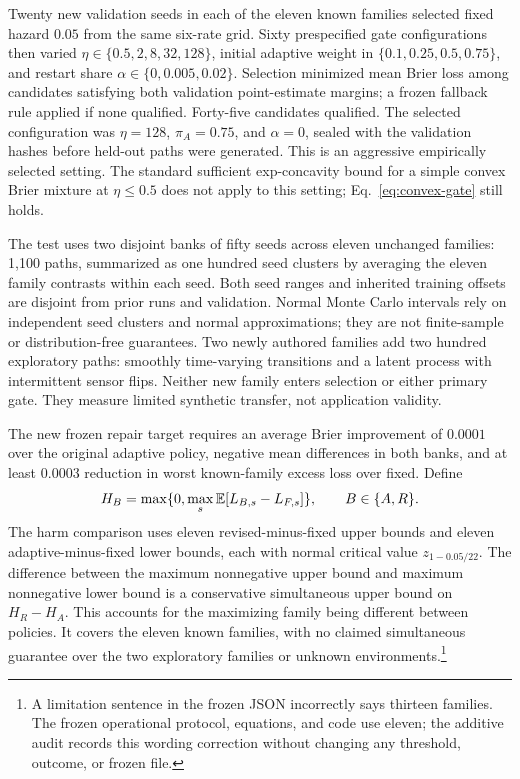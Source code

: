 Twenty new validation seeds in each of the eleven known families selected fixed hazard $0.05$ from the same six-rate grid. Sixty prespecified gate configurations then varied $\eta\in\{0.5,2,8,32,128\}$, initial adaptive weight in $\{0.1,0.25,0.5,0.75\}$, and restart share $\alpha\in\{0,0.005,0.02\}$. Selection minimized mean Brier loss among candidates satisfying both validation point-estimate margins; a frozen fallback rule applied if none qualified. Forty-five candidates qualified. The selected configuration was $\eta=128$, $\pi_A=0.75$, and $\alpha=0$, sealed with the validation hashes before held-out paths were generated. This is an aggressive empirically selected setting. The standard sufficient exp-concavity bound for a simple convex Brier mixture at $\eta\le0.5$ does not apply to this setting; Eq.~\eqref{eq:convex-gate} still holds.

The test uses two disjoint banks of fifty seeds across eleven unchanged families: 1,100 paths, summarized as one hundred seed clusters by averaging the eleven family contrasts within each seed. Both seed ranges and inherited training offsets are disjoint from prior runs and validation. Normal Monte Carlo intervals rely on independent seed clusters and normal approximations; they are not finite-sample or distribution-free guarantees. Two newly authored families add two hundred exploratory paths: smoothly time-varying transitions and a latent process with intermittent sensor flips. Neither new family enters selection or either primary gate. They measure limited synthetic transfer, not application validity.

The new frozen repair target requires an average Brier improvement of $0.0001$ over the original adaptive policy, negative mean differences in both banks, and at least $0.0003$ reduction in worst known-family excess loss over fixed. Define
\begin{equation}
 H_B=\max\{0,\max_s\mathbb{E}[L_{B,s}-L_{F,s}]\},\qquad B\in\{A,R\}.
\end{equation}
The harm comparison uses eleven revised-minus-fixed upper bounds and eleven adaptive-minus-fixed lower bounds, each with normal critical value $z_{1-0.05/22}$. The difference between the maximum nonnegative upper bound and maximum nonnegative lower bound is a conservative simultaneous upper bound on $H_R-H_A$. This accounts for the maximizing family being different between policies. It covers the eleven known families, with no claimed simultaneous guarantee over the two exploratory families or unknown environments.\footnote{A limitation sentence in the frozen JSON incorrectly says thirteen families. The frozen operational protocol, equations, and code use eleven; the additive audit records this wording correction without changing any threshold, outcome, or frozen file.}


